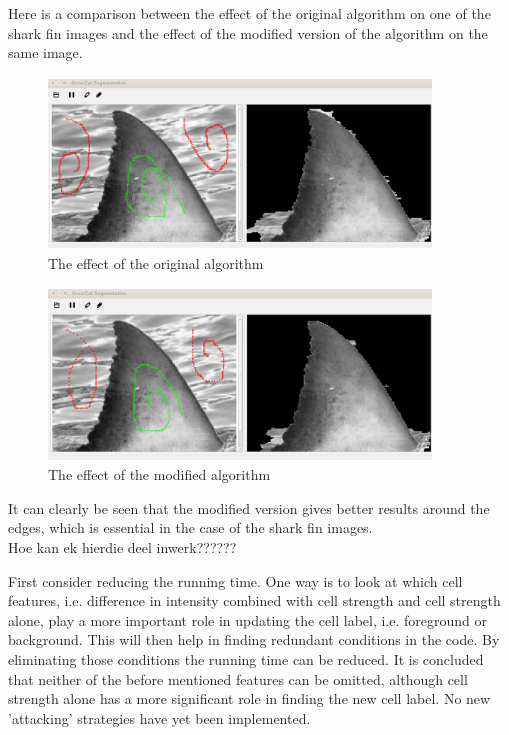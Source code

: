 \documentclass[a4paper,10pt]{article}
\begin{document}
\newpage
\noindent Here is a comparison between the effect of the original algorithm on
one of the shark fin images and the effect of the modified version of the
algorithm on the same image.
\begin{figure}[H]
 \centering
 \includegraphics[width=4in, height=1.8in]{haaio}
 \caption{The effect of the original algorithm}
 \label{fin1}
\end{figure}

\begin{figure}[H]
 \centering
 \includegraphics[width=4in, height=1.8in]{haaim}
 \caption{The effect of the modified algorithm}
 \label{fin}
\end{figure}

\noindent It can clearly be seen that the modified version gives better results
around the edges, which is essential in the case of the shark fin images. \\ 

Hoe kan ek hierdie deel inwerk??????

First consider reducing the running time.  One way is to look at which cell
features, i.e. difference in intensity combined with cell strength 
and cell strength alone, play a more important role in updating the cell label,
i.e. foreground or background.   This will then help in finding 
redundant conditions in the code.  By eliminating those conditions the running
time can be reduced.  It is concluded that neither of the before
mentioned features can be omitted, although cell strength alone has a more
significant role in finding the new cell label.  No new 'attacking' 
strategies have yet been implemented. \\
\end{document}
